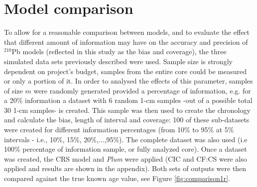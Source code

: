 \documentclass [10pt] {article}
\begin{document}

\section{Model comparison}

To allow for a reasonable comparison between models, and to evaluate the effect that different amount of information may have on the accuracy and precision of $^{210}$Pb models (reflected in this study as the bias and coverage), the three simulated data sets previously described were used. 
Sample size is strongly dependent on project's budget, samples from the entire core could be measured or only a portion of it.
In order to analysed the effects of this parameter, samples of size $m$ were randomly generated provided a percentage of information, e.g. for a 20\% information a dataset with 6 random 1-cm samples -out of a possible total 30 1-cm samples- is created.
This sample was then used to create the chronology and calculate the bias, length of interval and coverage:
100 of these sub-datasets were created for different information percentages (from 10\% to 95\% at 5\% intervals - i.e., 10\%, 15\%, 20\%,...,95\%). 
The complete dataset was also used (i.e 100\% percentage of information sample, or fully analyzed core).
Once a dataset was created, the CRS model and \textit{Plum} were applied (CIC and CF:CS were also applied and results are shown in the appendix).  
Both sets of outputs were then compared against the true known age value, see Figure \ref{fig:comparison1r}.
\end{document}
